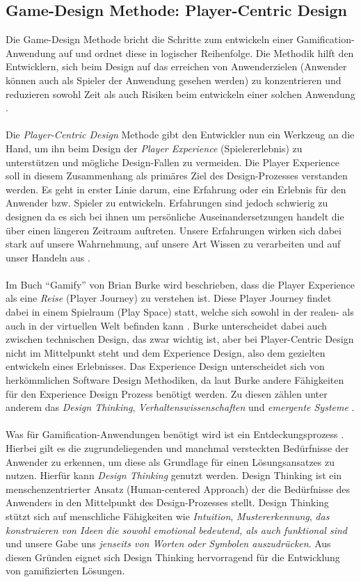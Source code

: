 \documentclass[a4paper,12pt]{scrartcl}
\begin{document}
\subsection{Game-Design Methode: Player-Centric Design}
Die Game-Design Methode bricht die Schritte zum entwickeln einer Gamification-Anwendung auf und ordnet diese in logischer Reihenfolge. Die Methodik hilft den Entwicklern, sich beim Design auf das erreichen von Anwenderzielen (Anwender können auch als Spieler der Anwendung gesehen werden) zu konzentrieren und reduzieren sowohl Zeit als auch Risiken beim entwickeln einer solchen Anwendung \cite{gamificationDefinition}.
\\\\
Die \textit{Player-Centric Design} Methode gibt den Entwickler nun ein Werkzeug an die Hand, um ihn beim Design der \textit{Player Experience} (Spielererlebnis) zu unterstützen und mögliche Design-Fallen zu vermeiden. Die Player Experience soll in diesem Zusammenhang als primäres Ziel des Design-Prozesses verstanden werden. Es geht in erster Linie darum, eine Erfahrung oder ein Erlebnis für den Anwender bzw. Spieler zu entwickeln. Erfahrungen sind jedoch schwierig zu designen da es sich bei ihnen um persönliche Auseinandersetzungen handelt die über einen längeren Zeitraum auftreten. Unsere Erfahrungen wirken sich dabei stark auf unsere Wahrnehmung, auf unsere Art Wissen zu verarbeiten und auf unser Handeln aus \cite{gamificationDefinition}.
\\\\ 
Im Buch \enquote{Gamify} von Brian Burke wird beschrieben, dass die Player Experience als eine \textit{Reise} (Player Journey) zu verstehen ist. Diese Player Journey findet dabei in einem Spielraum (Play Space) statt, welche sich sowohl in der realen- als auch in der virtuellen Welt befinden kann \cite{gamificationDefinition}. Burke unterscheidet dabei auch zwischen technischen Design, das zwar wichtig ist, aber bei Player-Centric Design nicht im Mittelpunkt steht und dem Experience Design, also dem gezielten entwickeln eines Erlebnisses. Das Experience Design unterscheidet sich von herkömmlichen Software Design Methodiken, da laut Burke andere Fähigkeiten für den Experience Design Prozess benötigt werden. Zu diesen zählen unter anderem das \textit{Design Thinking}, \textit{Verhaltenswissenschaften} und \textit{emergente Systeme} \cite{gamificationDefinition}.
\\\\
Was für Gamification-Anwendungen benötigt wird ist ein Entdeckungsprozess \cite{gamificationDefinition}. Hierbei gilt es die zugrundeliegenden und manchmal versteckten Bedürfnisse der Anwender zu erkennen, um diese als Grundlage für einen Lösungsansatzes zu nutzen. Hierfür kann \textit{Design Thinking} genutzt werden. Design Thinking ist ein menschenzentrierter Ansatz (Human-centered Approach) der die Bedürfnisse des Anwenders in den Mittelpunkt des Design-Prozesses stellt. Design Thinking stützt sich auf menschliche Fähigkeiten wie \textit{Intuition}, \textit{Mustererkennung}, \textit{das konstruieren von Ideen die sowohl emotional bedeutend, als auch funktional sind} und unsere Gabe uns \textit{jenseits von Worten oder Symbolen auszudrücken}. Aus diesen Gründen eignet sich Design Thinking hervorragend für die Entwicklung von gamifizierten Lösungen.
\end{document}
